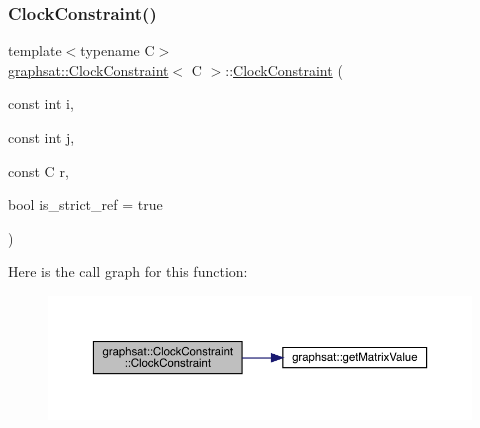 \subsubsection{\texorpdfstring{ClockConstraint()}{ClockConstraint()}\hspace{0.1cm}{\footnotesize\ttfamily [1/2]}}
{\footnotesize\ttfamily template$<$typename C$>$ \\
\mbox{\hyperlink{classgraphsat_1_1_clock_constraint}{graphsat\+::\+Clock\+Constraint}}$<$ C $>$\+::\mbox{\hyperlink{classgraphsat_1_1_clock_constraint}{Clock\+Constraint}} (\begin{DoxyParamCaption}\item[{const int}]{i,  }\item[{const int}]{j,  }\item[{const C}]{r,  }\item[{bool}]{is\+\_\+strict\+\_\+ref = {\ttfamily true} }\end{DoxyParamCaption})\hspace{0.3cm}{\ttfamily [inline]}}

Here is the call graph for this function\+:
\nopagebreak
\begin{figure}[H]
\begin{center}
\leavevmode
\includegraphics[width=350pt]{classgraphsat_1_1_clock_constraint_acb93892181e50c6bbbe2a67faaf27242_cgraph}
\end{center}
\end{figure}
\mbox{\label{classgraphsat_1_1_clock_constraint_a81ba549abd62032b7491ff03190d31e0}} 
